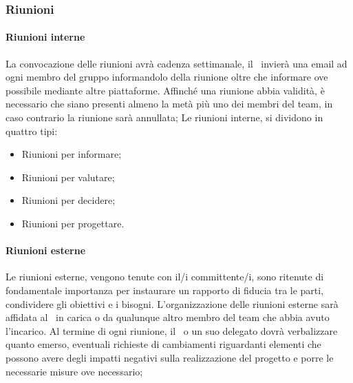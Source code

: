 \documentclass[../NormeDiProgetto.tex]{subfiles}
\begin{document}
\subsubsection{Riunioni}
	\paragraph{Riunioni interne}
		La convocazione delle riunioni avrà cadenza settimanale, il \responsabilediprogetto\ invierà una email ad ogni membro del gruppo informandolo della riunione oltre che informare ove possibile mediante altre piattaforme.
Affinché una riunione abbia validità, è necessario che siano presenti almeno la metà più uno dei membri del team, in caso contrario la riunione sarà annullata;
Le riunioni interne, si dividono in quattro tipi:
\begin{itemize}
	\item Riunioni per informare;
	\item Riunioni per valutare;
	\item Riunioni per decidere;
	\item Riunioni per progettare.
\end{itemize}
	\paragraph{Riunioni esterne}
		Le riunioni esterne, vengono tenute con il/i committente/i, sono ritenute di fondamentale importanza per instaurare un rapporto di fiducia tra le parti, condividere gli obiettivi e i bisogni.
L'organizzazione delle riunioni esterne sarà affidata al \responsabilediprogetto\ in carica o da qualunque altro membro del team che abbia avuto l'incarico.
Al termine di ogni riunione, il \responsabilediprogetto\ o un suo delegato dovrà verbalizzare quanto emerso, eventuali richieste di cambiamenti riguardanti elementi che possono avere degli impatti negativi sulla realizzazione del progetto e porre le necessarie misure ove necessario;
\end{document}
